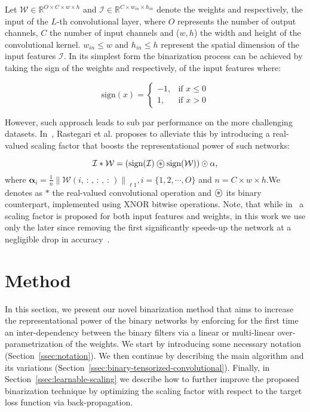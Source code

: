\documentclass[10pt,twocolumn,letterpaper]{article}
\newcommand\oast{\stackMath\mathbin{\stackinset{c}{0ex}{c}{0ex}{\ast}{\bigcirc}}}
\newcommand{\norm}[1]{\left\lVert#1\right\rVert}
\newcommand{\mytensor}[1]{\ensuremath{\mathcal{#1}}}
\newcommand{\myvector}[1]{\ensuremath{\mathbf{#1}}}
\newcommand{\mycolon}{\,\boldsymbol{:}\,}
\begin{document}
Let $\mytensor{W}\in \mathbb{R}^{O\times C\times w \times h}$ and $\mytensor{I}\in \mathbb{R}^{C\times w_{in} \times h_{in}}$ denote the weights and respectively, the input of the $L$-th convolutional layer, where $O$ represents the number of output channels, $C$ the number of input channels and ($w,h$) the width and height of the convolutional kernel. $w_{in}\leq w$ and $h_{in}\leq h$ represent the spatial dimension of the input features $\mytensor{I}$. In its simplest form the binarization process can be achieved by taking the sign of the weights and respectively, of the input features where:

\begin{equation}\label{eq:sign}
    \text{sign}(x) = \begin{cases} -1, & \mbox{if } x\leq 0 \\ 1, & \mbox{if } x>0 \end{cases}
\end{equation}

However, such approach leads to sub par performance on the more challenging datasets. In~\cite{rastegari2016xnor}, Rastegari et al. proposes to alleviate this by introducing a real-valued scaling factor that boosts the representational power of such networks:

\begin{equation}\label{eq:binarize}
    \mytensor{I} \ast \mytensor{W} = \left(\text{sign}(\mytensor{I}) \oast \text{sign}(\mytensor{W}) \right) \odot \myvector{\alpha},
\end{equation}
where $\myvector{\alpha}_{i} = \frac{1}{n}\norm{\mytensor{W}(i, \mycolon, \mycolon, \mycolon)}_{\ell 1}, i=\{1, 2, \cdots, O\}$ 
and $n = C\times w \times h$.We denotes as $\ast$ the real-valued convolutional operation and $\oast$ its binary counterpart, implemented using XNOR bitwise operations. Note, that while in~\cite{rastegari2016xnor} a scaling factor is proposed for both input features and weights, in this work we use only the later since removing the first significantly speeds-up the network at a negligible drop in accuracy~\cite{rastegari2016xnor,bulat2017binarized}.





\section{Method}\label{sec:method}

In this section, we present our novel binarization method that aims to increase the representational power of the binary networks by enforcing for the first time an inter-dependency between the binary filters via a linear or multi-linear over-parametrization of the weights. We start by introducing some necessary notation (Section~\ref{ssec:notation}). We then continue by describing the main algorithm and its variations (Section~\ref{ssec:binary-tensorized-convolutional}). Finally, in Section~\ref{ssec:learnable-scaling} we describe how to further improve the proposed binarization technique by optimizing the scaling factor with respect to the target loss function via back-propagation. 
\end{document}
